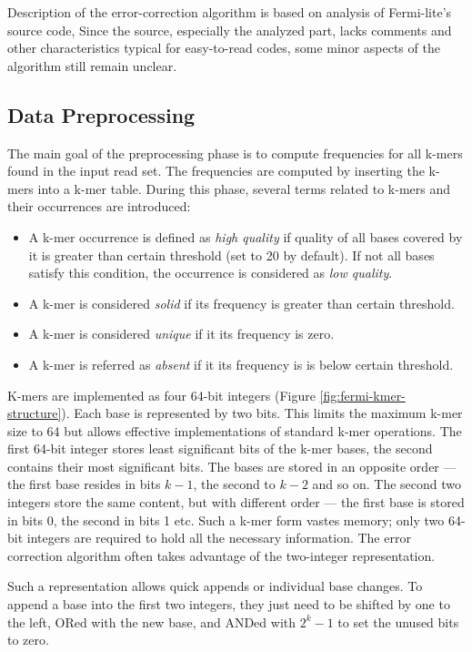 Description of the error-correction algorithm is based on analysis of Fermi-lite's source code, Since the source, especially the analyzed part, lacks comments and other characteristics typical for easy-to-read codes, some minor aspects of the algorithm still remain unclear.

\subsection{Data Preprocessing}
\label{subsec:fermi-data-preprocessing}

The main goal of the preprocessing phase is to compute frequencies for all k-mers found in the input read set. The frequencies are computed by inserting the k-mers into a k-mer table. During this phase, several terms related to k-mers and their occurrences are introduced:
\begin{itemize}
\item A k-mer occurrence is defined as \textit{high quality} if quality of all bases covered by it is greater than certain threshold (set to 20 by default). If not all bases satisfy this condition, the occurrence is considered as \textit{low quality}.
\item A k-mer is considered \textit{solid} if its frequency is greater than certain threshold.
\item A k-mer is considered \textit{unique} if it its frequency is zero.
\item A k-mer is referred as \textit{absent} if it its frequency is is below certain threshold.
\end{itemize}
K-mers are implemented as four 64-bit integers (Figure \ref{fig:fermi-kmer-structure}). Each base is represented by two bits. This limits the maximum k-mer size to 64 but allows effective implementations of standard k-mer operations. The first 64-bit integer stores least significant bits of the k-mer bases, the second contains their most significant bits. The bases are stored in an opposite order --- the first base resides in bits $k-1$, the second to $k-2$ and so on. The second two integers store the same content, but with different order --- the first base is stored in bits 0, the second in bits 1 etc. Such a k-mer form vastes memory; only two 64-bit integers are required to hold all the necessary information. The error correction algorithm often takes advantage of the two-integer representation.

Such a representation allows quick appends or individual base changes. To append a base into the first two integers, they just need to be shifted by one to the left, ORed with the new base, and ANDed with $2^k-1$ to set the unused bits to zero.

